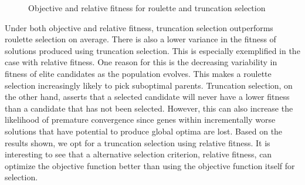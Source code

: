 \begin{figure}[!h]
\centering
            \hfill
            \hfill
            \caption{Objective and relative fitness for roulette and truncation selection}
\label{fig:objective}
\end{figure}

Under both objective and relative fitness, truncation selection outperforms roulette selection on average. There is also a lower variance in the fitness of solutions produced using truncation selection. This is especially exemplified in the case with relative fitness. One reason for this is the decreasing variability in fitness of elite candidates as the population evolves. This makes a roulette selection increasingly likely to pick suboptimal parents. Truncation selection, on the other hand, asserts that a selected candidate will never have a lower fitness than a candidate that has not been selected. However, this can also increase the likelihood of premature convergence since genes within incrementally worse solutions that have potential to produce global optima are lost. Based on the results shown, we opt for a truncation selection using relative fitness. It is interesting to see that a alternative selection criterion, relative fitness, can optimize the objective function better than using the objective function itself for selection.


